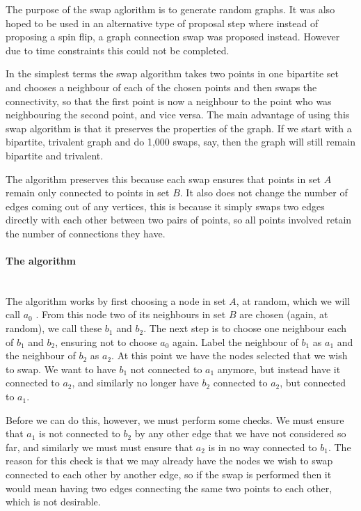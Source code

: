 \documentclass[pdftex,12pt,a4paper]{article}
\begin{document}
The purpose of the swap aglorithm is to generate random graphs. It was also hoped to be used in an alternative type of proposal step where instead of proposing a spin flip, a graph connection swap was proposed instead. However due to time constraints this could not be completed.

In the simplest terms the swap algorithm takes two points in one bipartite set and chooses a neighbour of each of the chosen points and then swaps the connectivity, so that the first point is now a neighbour to the point who was neighbouring the second point, and vice versa. The main advantage of using this swap algorithm is that it preserves the properties of the graph. If we start with a bipartite, trivalent graph and do 1,000 swaps, say, then the graph will still remain bipartite and trivalent.

The algorithm preserves this because each swap ensures that points in set $A$ remain only connected to points in set $B$. It also does not change the number of edges coming out of any vertices, this is because it simply swaps two edges directly with each other between two pairs of points, so all points involved retain the number of connections they have.

\newpage
\paragraph{The algorithm} ~\\

The algorithm works by first choosing a node in set $A$, at random, which we will call $a_0$ . From this node two of its neighbours in set $B$ are chosen (again, at random), we call these $b_1$ and $b_2$. The next step is to choose one neighbour each of $b_1$ and $b_2$, ensuring not to choose $a_0$ again. Label the neighbour of $b_1$ as $a_1$ and the neighbour of $b_2$ as $a_2$. At this point we have the nodes selected that we wish to swap. We want to have $b_1$ not connected to $a_1$ anymore, but instead have it connected to $a_2$, and similarly no longer have $b_2$ connected to $a_2$, but connected to $a_1$.

Before we can do this, however, we must perform some checks. We must ensure that $a_1$ is not connected to $b_2$ by any other edge that we have not considered so far, and similarly we must must ensure that $a_2$ is in no way connected to $b_1$. The reason for this check is that we may already have the nodes we wish to swap connected to each other by another edge, so if the swap is performed then it would mean having two edges connecting the same two points to each other, which is not desirable.
\end{document}
